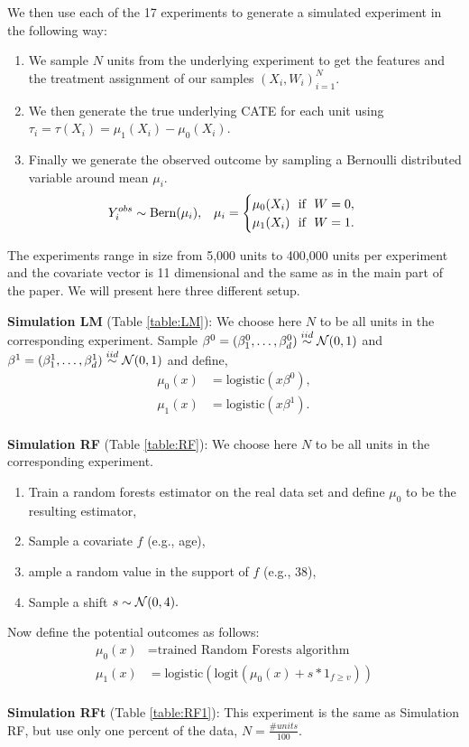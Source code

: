 We then use each of the 17 experiments to generate a simulated experiment in the following way: 
\begin{enumerate}
\item We sample $N$ units from the underlying experiment to get the features and the treatment assignment of our samples $(X_i, W_i)_{i=1}^N$.
\item We then generate the true underlying CATE for each unit using $\tau_i = \tau(X_i) = \mu_1(X_i) - \mu_0(X_i)$.
\item Finally we generate the observed outcome by sampling a Bernoulli distributed variable around mean $\mu_i$. 
  \begin{align*}
  	&Y^{obs}_i \sim \mbox{Bern}(\mu_i),&
    &\mu_i = 
    \begin{cases}
    \mu_0(X_i) ~ ~ \mbox{if} ~ ~ W = 0,\\
    \mu_1(X_i) ~ ~ \mbox{if} ~ ~ W = 1.
    \end{cases}&
  \end{align*}
\end{enumerate}

The experiments range in size from 5,000 units to 400,000 units per experiment and the covariate vector is 11 dimensional and the same as in the main part of the paper.
We will present here three different setup. 

\textbf{Simulation LM} (Table \ref{table:LM}):
We choose here $N$ to be all units in the corresponding experiment.
Sample $\beta^0 = (\beta^0_1, \ldots, \beta^0_d) \overset{iid}{\sim} \mathcal{N}(0,1)$ and
$\beta^1 = (\beta^1_1, \ldots, \beta^1_d) \overset{iid}{\sim} \mathcal{N}(0,1)$ and define,
\begin{align*}
\mu_0(x) &= \mbox{logistic}\left(x \beta^0\right), \\
\mu_1(x) &= \mbox{logistic}\left(x \beta^1\right).
\end{align*}
\\ \textbf{Simulation RF} (Table \ref{table:RF}):
We choose here $N$ to be all units in the corresponding experiment.
\begin{enumerate}
	\item Train a random forests estimator on the real data set and define $\mu_0$ to be the resulting estimator,
	\item Sample a covariate $f$ (e.g., age),
    \item ample a random value in the support of $f$ (e.g., 38),
    \item Sample a shift $s \sim \mathcal{N}(0, 4).$
\end{enumerate}
Now define the potential outcomes as follows:
\begin{align*} 
\mu_0(x) &= \mbox{trained Random Forests algorithm}\\
\mu_1(x) &= \mbox{logistic}\left(\mbox{logit}\left(\mu_0(x) + s * 1_{f\ge v} \right)\right)
\end{align*}
\\ \textbf{Simulation RFt} (Table \ref{table:RF1}):
This experiment is the same as Simulation RF, but use only one percent of the data, $N = \frac{\# units}{100}$.


